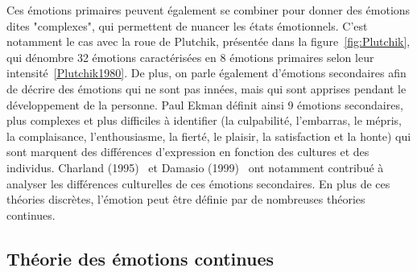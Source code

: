 Ces émotions primaires peuvent également se combiner pour donner des émotions dites "complexes", qui permettent de nuancer les états émotionnels. C'est notamment le cas avec la roue de Plutchik, présentée dans la figure~\ref{fig:Plutchik}, qui dénombre 32 émotions caractérisées en 8 émotions primaires selon leur intensité~\ref{Plutchik1980}. De plus, on parle également d'émotions secondaires afin de décrire des émotions qui ne sont pas innées, mais qui sont apprises pendant le développement de la personne. Paul Ekman définit ainsi 9 émotions secondaires, plus complexes et plus difficiles à identifier (la culpabilité, l'embarras, le mépris, la complaisance, l'enthousiasme, la fierté, le plaisir, la satisfaction et la honte) qui sont marquent des différences d'expression en fonction des cultures et des individus. Charland (1995)~\cite{Charland1995} et Damasio (1999)~\cite{Damasio1999} ont notamment contribué à analyser les différences culturelles de ces émotions secondaires.
En plus de ces théories discrètes, l'émotion peut être définie par de nombreuses théories continues.

\subsection{Théorie des émotions continues}

